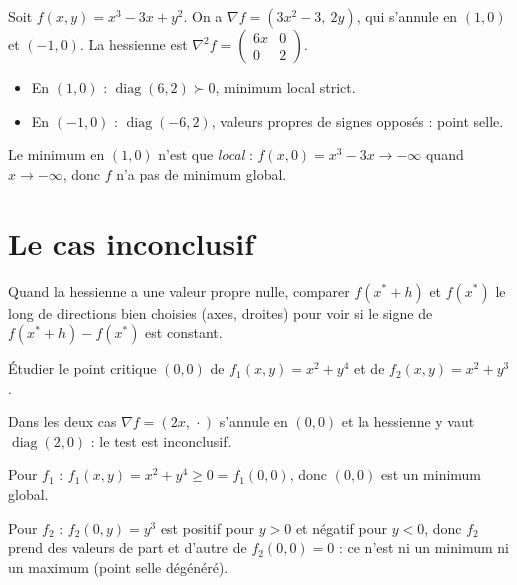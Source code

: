 \begin{exemple}
Soit $f(x,y)=x^3-3x+y^2$. On a $\nabla f=(3x^2-3,\ 2y)$, qui s'annule en $(1,0)$ et $(-1,0)$. La hessienne est $\nabla^2f=\begin{pmatrix}6x&0\\0&2\end{pmatrix}$.
\begin{itemize}
  \item En $(1,0)$ : $\operatorname{diag}(6,2)\succ0$, minimum local strict.
  \item En $(-1,0)$ : $\operatorname{diag}(-6,2)$, valeurs propres de signes opposés : point selle.
\end{itemize}
Le minimum en $(1,0)$ n'est que \emph{local} : $f(x,0)=x^3-3x\to-\infty$ quand $x\to-\infty$, donc $f$ n'a pas de minimum global.
\end{exemple}

\section{Le cas inconclusif}

\begin{methode}
Quand la hessienne a une valeur propre nulle, comparer $f(x^*+h)$ et $f(x^*)$ le long de directions bien choisies (axes, droites) pour voir si le signe de $f(x^*+h)-f(x^*)$ est constant.
\end{methode}

\begin{exercice}[Application]
Étudier le point critique $(0,0)$ de $f_1(x,y)=x^2+y^4$ et de $f_2(x,y)=x^2+y^3$.
\begin{correction}
Dans les deux cas $\nabla f=(2x,\,\cdot)$ s'annule en $(0,0)$ et la hessienne y vaut $\operatorname{diag}(2,0)$ : le test est inconclusif.

Pour $f_1$ : $f_1(x,y)=x^2+y^4\ge0=f_1(0,0)$, donc $(0,0)$ est un minimum global.

Pour $f_2$ : $f_2(0,y)=y^3$ est positif pour $y>0$ et négatif pour $y<0$, donc $f_2$ prend des valeurs de part et d'autre de $f_2(0,0)=0$ : ce n'est ni un minimum ni un maximum (point selle dégénéré).
\end{correction}
\end{exercice}
